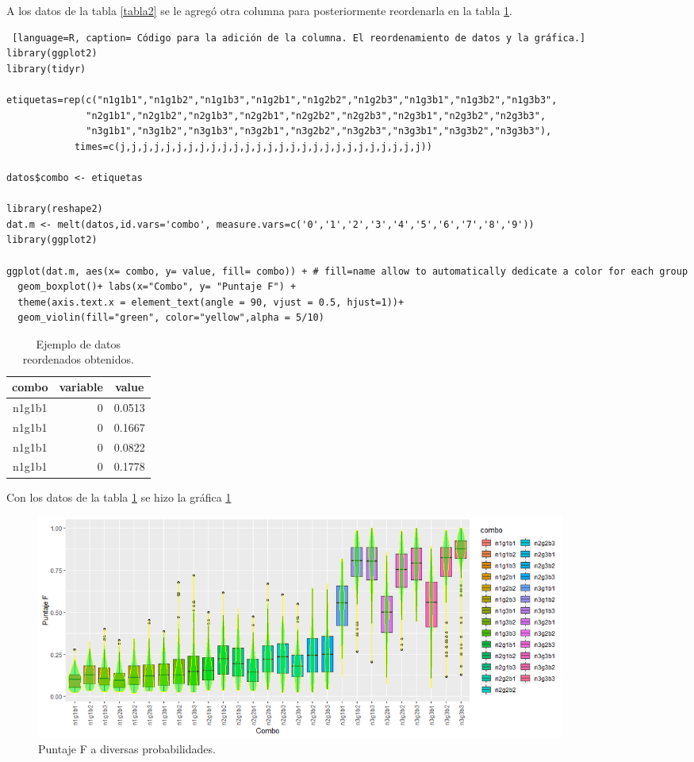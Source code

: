 \documentclass{article}
\begin{document}
A los datos de la tabla \ref{tabla2} se le agregó otra columna para posteriormente reordenarla en la tabla \ref{tabla3}.

\begin{lstlisting} [language=R, caption= Código para la adición de la columna. El reordenamiento de datos y la gráfica.]
library(ggplot2)
library(tidyr)

etiquetas=rep(c("n1g1b1","n1g1b2","n1g1b3","n1g2b1","n1g2b2","n1g2b3","n1g3b1","n1g3b2","n1g3b3",
              "n2g1b1","n2g1b2","n2g1b3","n2g2b1","n2g2b2","n2g2b3","n2g3b1","n2g3b2","n2g3b3",
              "n3g1b1","n3g1b2","n3g1b3","n3g2b1","n3g2b2","n3g2b3","n3g3b1","n3g3b2","n3g3b3"),
            times=c(j,j,j,j,j,j,j,j,j,j,j,j,j,j,j,j,j,j,j,j,j,j,j,j,j,j,j))

datos$combo <- etiquetas 

library(reshape2)
dat.m <- melt(datos,id.vars='combo', measure.vars=c('0','1','2','3','4','5','6','7','8','9'))
library(ggplot2)

ggplot(dat.m, aes(x= combo, y= value, fill= combo)) + # fill=name allow to automatically dedicate a color for each group
  geom_boxplot()+ labs(x="Combo", y= "Puntaje F") +
  theme(axis.text.x = element_text(angle = 90, vjust = 0.5, hjust=1))+
  geom_violin(fill="green", color="yellow",alpha = 5/10)
\end{lstlisting}

\begin{table}[h!]
\centering
\caption{Ejemplo de datos reordenados obtenidos.}
\label{tabla3}
\begin{tabular}{|c|r|r|}
\hline
\textbf{combo} & \multicolumn{1}{c|}{\textbf{variable}} & \multicolumn{1}{c|}{\textbf{value}} \\ \hline
n1g1b1 & 0 & 0.0513 \\ \hline
n1g1b1 & 0 & 0.1667 \\ \hline
n1g1b1 & 0 & 0.0822 \\ \hline
n1g1b1 & 0 & 0.1778 \\ \hline
\end{tabular}
\end{table}

Con los datos de la tabla \ref{tabla3} se hizo la gráfica \ref{grafica1}

\begin{figure} [h!]%
\renewcommand{\figurename}{Gráfica}
    \centering
    \caption{ Puntaje F a diversas probabilidades.}
    \label{grafica1}
    \includegraphics[width=175mm]{grafica1.png} %
\end{figure}
\end{document}
